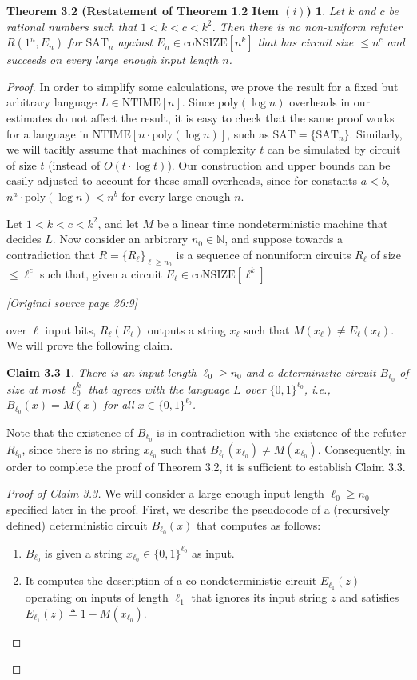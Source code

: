 \documentclass[11pt]{article}
\newcommand{\SAT}{\mathrm{SAT}}
\newcommand{\coNSIZE}{\mathrm{coNSIZE}}
\newcommand{\NTIME}{\mathrm{NTIME}}
\newcommand{\poly}{\mathrm{poly}}
\newcommand{\sourcepage}[1]{\par\Needspace{5\baselineskip}\bigskip\noindent\textit{[Original source page 26:#1]}\par\medskip}
\newtheorem*{sourcetheoremthreetwo}{Theorem 3.2 \textnormal{(Restatement of Theorem 1.2 Item $(i)$)}}
\newtheorem*{sourceclaimthreethree}{Claim 3.3}
\begin{document}
\begin{sourcetheoremthreetwo}
Let $k$ and $c$ be rational numbers such that $1<k<c<k^2$. Then there is no non-uniform refuter $R(1^n,E_n)$ for $\SAT_n$ against $E_n\in\coNSIZE[n^k]$ that has circuit size $\le n^c$ and succeeds on every large enough input length $n$.
\end{sourcetheoremthreetwo}
\begin{proof}
In order to simplify some calculations, we prove the result for a fixed but arbitrary language $L\in\NTIME[n]$. Since $\poly(\log n)$ overheads in our estimates do not affect the result, it is easy to check that the same proof works for a language in $\NTIME[n\cdot\poly(\log n)]$, such as $\SAT=\{\SAT_n\}$. Similarly, we will tacitly assume that machines of complexity $t$ can be simulated by circuit of size $t$ (instead of $O(t\cdot\log t)$). Our construction and upper bounds can be easily adjusted to account for these small overheads, since for constants $a<b$, $n^a\cdot\poly(\log n)<n^b$ for every large enough $n$.

Let $1<k<c<k^2$, and let $M$ be a linear time nondeterministic machine that decides $L$. Now consider an arbitrary $n_0\in\mathbb N$, and suppose towards a contradiction that $R=\{R_\ell\}_{\ell\ge n_0}$ is a sequence of nonuniform circuits $R_\ell$ of size $\le\ell^c$ such that, given a circuit $E_\ell\in\coNSIZE[\ell^k]$

\sourcepage{9}
over $\ell$ input bits, $R_\ell(E_\ell)$ outputs a string $x_\ell$ such that $M(x_\ell)\ne E_\ell(x_\ell)$. We will prove the following claim.

\begin{sourceclaimthreethree}
There is an input length $\ell_0\ge n_0$ and a deterministic circuit $B_{\ell_0}$ of size at most $\ell_0^k$ that agrees with the language $L$ over $\{0,1\}^{\ell_0}$, i.e., $B_{\ell_0}(x)=M(x)$ for all $x\in\{0,1\}^{\ell_0}$.
\end{sourceclaimthreethree}
Note that the existence of $B_{\ell_0}$ is in contradiction with the existence of the refuter $R_{\ell_0}$, since there is no string $x_{\ell_0}$ such that $B_{\ell_0}(x_{\ell_0})\ne M(x_{\ell_0})$. Consequently, in order to complete the proof of Theorem 3.2, it is sufficient to establish Claim 3.3.

\begin{proof}[Proof of Claim 3.3]
We will consider a large enough input length $\ell_0\ge n_0$ specified later in the proof. First, we describe the pseudocode of a (recursively defined) deterministic circuit $B_{\ell_0}(x)$ that computes as follows:
\begin{enumerate}[label=(\arabic*)]
\item $B_{\ell_0}$ is given a string $x_{\ell_0}\in\{0,1\}^{\ell_0}$ as input.
\item It computes the description of a co-nondeterministic circuit $E_{\ell_1}(z)$ operating on inputs of length $\ell_1$ that ignores its input string $z$ and satisfies $E_{\ell_1}(z)\triangleq1-M(x_{\ell_0})$.


\end{enumerate}
\end{proof}
\end{proof}
\end{document}
